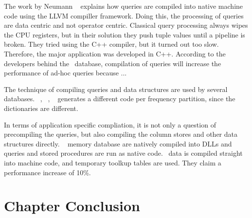 The work by Neumann \ea~\cite{Neumann2011-uq} explains how queries are compiled into native machine code using the LLVM compiller framework. Doing this, the processing of queries are data centric and not operator centric. Classical query processing always wipes the CPU registers, but in their solution they push tuple values until a pipeline is broken. They tried using the C++ compiler, but it turned out too slow. Therefore, the major application was developed in C++. According to the developers behind the \hyper~database, compilation of queries will increase the performance of ad-hoc queries because ...

The technique of compiling queries and data structures are used by several databases. \blink~\cite{Barber2012-xt}, \ibm~\cite{Raman2013-em}, \vertica~\cite{Lamb2012-kg} generates a different code per frequency partition, since the dictionaries are different. 


In terms of application specific compliation, it is not only a question of precompiling the queries, but also compiling the column stores and other data structures directly. \mssql~\cite{Delaney2014-ip} memory database are natively compiled into DLLs and queries and stored procedures are run as native code.\qlikview~\cite{noauthor_undated-js} data is compiled straight into machine code, and temporary toolkup tables are used. They claim a performance increase of 10\%.





\section{Chapter Conclusion}
\label{sec:Chapter Conclusion}

